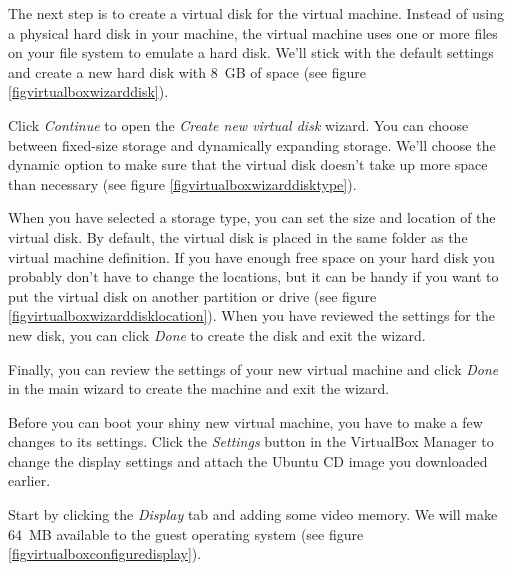 \documentclass[ebook,10pt,twoside,openright]{memoir}
\begin{document}

The next step is to create a virtual disk for the virtual machine. Instead of using a physical hard disk in your machine, the virtual machine uses one or more files on your file system to emulate a hard disk. We'll stick with the default settings and create a new hard disk with 8~GB of space (see figure \ref{figvirtualboxwizarddisk}).


Click \emph{Continue} to open the \emph{Create new virtual disk} wizard. You can choose between fixed-size storage and dynamically expanding storage. We'll choose the dynamic option to make sure that the virtual disk doesn't take up more space than necessary (see figure \ref{figvirtualboxwizarddisktype}).


When you have selected a storage type, you can set the size and location of the virtual disk. By default, the virtual disk is placed in the same folder as the virtual machine definition. If you have enough free space on your hard disk you probably don't have to change the locations, but it can be handy if you want to put the virtual disk on another partition or drive (see figure \ref{figvirtualboxwizarddisklocation}). When you have reviewed the settings for the new disk, you can click \emph{Done} to create the disk and exit the wizard.


Finally, you can review the settings of your new virtual machine and click \emph{Done} in the main wizard to create the machine and exit the wizard.

Before you can boot your shiny new virtual machine, you have to make a few changes to its settings. Click the \emph{Settings} button in the VirtualBox Manager to change the display settings and attach the Ubuntu CD image you downloaded earlier.

Start by clicking the \emph{Display} tab and adding some video memory. We will make 64~MB available to the guest operating system (see figure \ref{figvirtualboxconfiguredisplay}).
\end{document}
